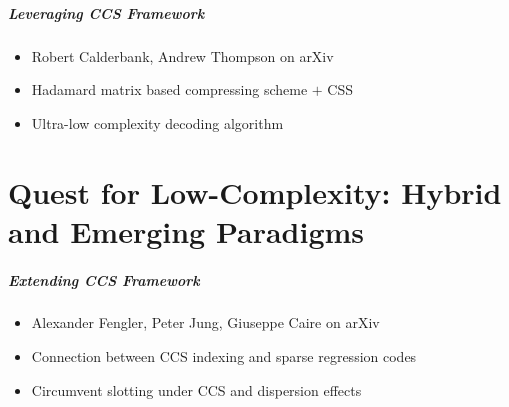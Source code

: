 \documentclass[10pt]{beamer}
\begin{document}
\begin{frame}
\frametitle{Leveraging CCS Framework}
\begin{center}
\end{center}
  \begin{itemize}
  \item Robert Calderbank, Andrew Thompson on arXiv
  \item Hadamard matrix based compressing scheme $+$  CSS
  \item Ultra-low complexity decoding algorithm
  \end{itemize}
\end{frame}


\part{Quest for Low-Complexity: \newline Hybrid and Emerging Paradigms}
\frame{\partpage}
\begin{frame}
\frametitle{Extending CCS Framework}
\begin{center}
\end{center}
  \begin{itemize}
  \item Alexander Fengler, Peter Jung, Giuseppe Caire on arXiv
  \item Connection between CCS indexing and sparse regression codes
  \item Circumvent slotting under CCS and dispersion effects
  \end{itemize}
\end{frame}
\end{document}

